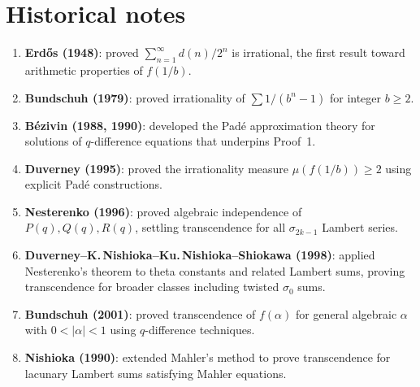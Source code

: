 \documentclass[12pt]{amsart}
\theoremstyle{definition}
\theoremstyle{remark}
\begin{document}
\section{Historical notes}

\begin{enumerate}
\item \textbf{Erd\H{o}s (1948)}: proved $\sum_{n=1}^{\infty}d(n)/2^n$
is irrational, the first result toward arithmetic properties of
$f(1/b)$.

\item \textbf{Bundschuh (1979)}: proved irrationality of
$\sum 1/(b^n-1)$ for integer $b\ge 2$.

\item \textbf{B\'ezivin (1988, 1990)}: developed the Pad\'e
approximation theory for solutions of $q$-difference equations that
underpins Proof~1.

\item \textbf{Duverney (1995)}: proved the irrationality measure
$\mu(f(1/b))\ge 2$ using explicit Pad\'e constructions.

\item \textbf{Nesterenko (1996)}: proved algebraic independence of
$P(q),Q(q),R(q)$, settling transcendence for all $\sigma_{2k-1}$
Lambert series.

\item \textbf{Duverney--K.\,Nishioka--Ku.\,Nishioka--Shiokawa (1998)}:
applied Nesterenko's theorem to theta constants and related Lambert
sums, proving transcendence for broader classes including twisted
$\sigma_0$ sums.

\item \textbf{Bundschuh (2001)}: proved transcendence of
$f(\alpha)$ for general algebraic $\alpha$ with $0<|\alpha|<1$
using $q$-difference techniques.

\item \textbf{Nishioka (1990)}: extended Mahler's method to prove
transcendence for lacunary Lambert sums satisfying Mahler equations.
\end{enumerate}

\end{document}
